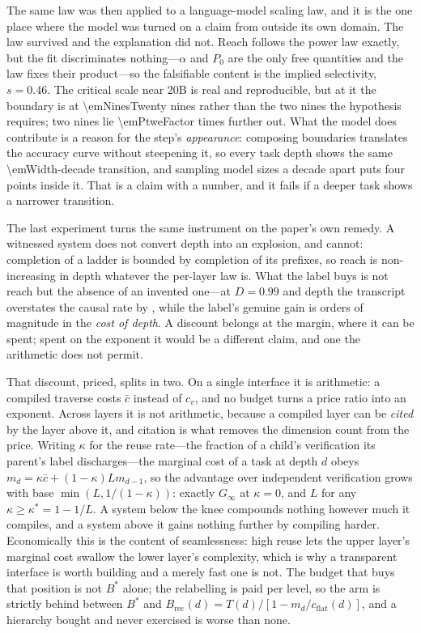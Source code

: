 \documentclass[conference]{IEEEtran}
\theoremstyle{definition}
\begin{document}
The same law was then applied to a language-model scaling law, and it is the one
place where the model was turned on a claim from outside its own domain. The law
survived and the explanation did not. Reach follows the power law exactly, but the
fit discriminates nothing---$\alpha$ and $P_0$ are the only free quantities and the
law fixes their product---so the falsifiable content is the implied selectivity,
$s=0.46$. The critical scale near \num{20}B is real and reproducible, but at it the
boundary is at \num{\emNinesTwenty} nines rather than the two nines the hypothesis
requires; two nines lie \num{\emPtweFactor} times further out. What the model does
contribute is a reason for the step's \emph{appearance}: composing boundaries
translates the accuracy curve without steepening it, so every task depth shows the
same \num{\emWidth}-decade transition, and sampling model sizes a decade apart puts
four points inside it. That is a claim with a number, and it fails if a deeper task
shows a narrower transition.

The last experiment turns the same instrument on the paper's own remedy. A
witnessed system does not convert depth into an explosion, and cannot: completion
of a ladder is bounded by completion of its prefixes, so reach is non-increasing in
depth whatever the per-layer law is. What the label buys is not reach but the
absence of an invented one---at $D=0.99$ and depth \teDepthMax{} the transcript
overstates the causal rate by \teInflationDeep, while the label's genuine gain is
\teBOrders{} orders of magnitude in the \emph{cost of depth}. A discount belongs at
the margin, where it can be spent; spent on the exponent it would be a different
claim, and one the arithmetic does not permit.

That discount, priced, splits in two. On a single interface it is arithmetic: a
compiled traverse costs $\bar c$ instead of $c_v$, and no budget turns a price ratio
into an exponent. Across layers it is not arithmetic, because a compiled layer can
be \emph{cited} by the layer above it, and citation is what removes the dimension
count from the price. Writing $\kappa$ for the reuse rate---the fraction of a
child's verification its parent's label discharges---the marginal cost of a task at
depth $d$ obeys $m_d=\kappa\bar c+(1-\kappa)Lm_{d-1}$, so the advantage over
independent verification grows with base $\min(L,1/(1-\kappa))$: exactly $G_\infty$
at $\kappa=0$, and $L$ for any $\kappa\ge\kappa^{*}=1-1/L$. A system below the knee
compounds nothing however much it compiles, and a system above it gains nothing
further by compiling harder. Economically this is the content of seamlessness:
high reuse lets the upper layer's marginal cost swallow the lower layer's
complexity, which is why a transparent interface is worth building and a merely
fast one is not. The budget that buys that position is not $B^{*}$ alone; the
relabelling is paid per level, so the arm is strictly behind between $B^{*}$ and
$B_{\text{rec}}(d)=T(d)/[1-m_d/c_{\text{flat}}(d)]$, and a hierarchy bought and
never exercised is worse than none.
\end{document}
